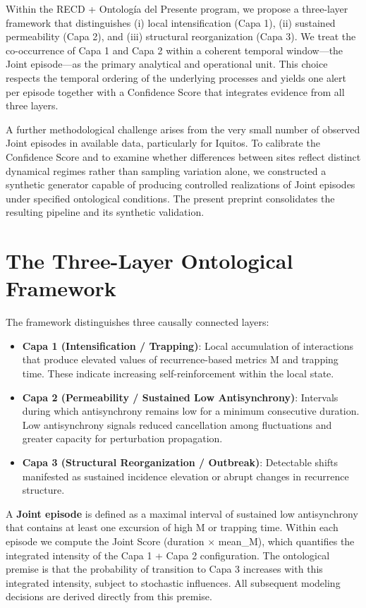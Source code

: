 \documentclass[11pt,a4paper]{article}
\begin{document}
Within the RECD + Ontología del Presente program, we propose a three-layer framework that distinguishes (i) local intensification (Capa 1), (ii) sustained permeability (Capa 2), and (iii) structural reorganization (Capa 3). We treat the co-occurrence of Capa 1 and Capa 2 within a coherent temporal window—the Joint episode—as the primary analytical and operational unit. This choice respects the temporal ordering of the underlying processes and yields one alert per episode together with a Confidence Score that integrates evidence from all three layers.

A further methodological challenge arises from the very small number of observed Joint episodes in available data, particularly for Iquitos. To calibrate the Confidence Score and to examine whether differences between sites reflect distinct dynamical regimes rather than sampling variation alone, we constructed a synthetic generator capable of producing controlled realizations of Joint episodes under specified ontological conditions. The present preprint consolidates the resulting pipeline and its synthetic validation.

\section{The Three-Layer Ontological Framework}

The framework distinguishes three causally connected layers:

\begin{itemize}
    \item \textbf{Capa 1 (Intensification / Trapping)}: Local accumulation of interactions that produce elevated values of recurrence-based metrics M and trapping time. These indicate increasing self-reinforcement within the local state.
    \item \textbf{Capa 2 (Permeability / Sustained Low Antisynchrony)}: Intervals during which antisynchrony remains low for a minimum consecutive duration. Low antisynchrony signals reduced cancellation among fluctuations and greater capacity for perturbation propagation.
    \item \textbf{Capa 3 (Structural Reorganization / Outbreak)}: Detectable shifts manifested as sustained incidence elevation or abrupt changes in recurrence structure.
\end{itemize}

A \textbf{Joint episode} is defined as a maximal interval of sustained low antisynchrony that contains at least one excursion of high M or trapping time. Within each episode we compute the Joint Score (duration $\times$ mean\_M), which quantifies the integrated intensity of the Capa 1 + Capa 2 configuration. The ontological premise is that the probability of transition to Capa 3 increases with this integrated intensity, subject to stochastic influences. All subsequent modeling decisions are derived directly from this premise.
\end{document}
